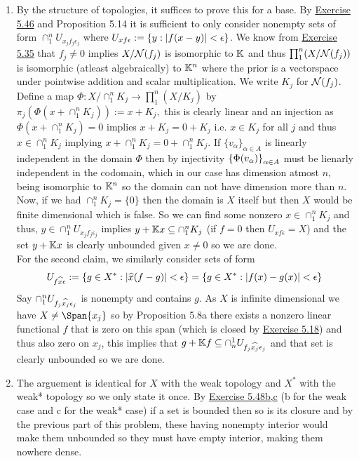 \documentclass[12pt,a4paper]{article}
\begin{document}
\begin{solution}
    \begin{enumerate}[label=\alph*.]
        \item By the structure of topologies, it suffices to prove this for a base. 
            By \hyperref[prob:5-46]{Exercise 5.46} and Proposition 5.14 it is sufficient to only consider nonempty sets of form $\cap_1^nU_{x_jf_j\epsilon_j}$ where $U_{xf\epsilon}:= \qty{y:|f(x-y)|<\epsilon}$. 
            We know from \hyperref[prob:5-35]{Exercise 5.35} that $f_j\neq 0$ implies $X/\mathcal{N}(f_j)$ is isomorphic to $\mathbb{K}$ and thus $\prod_1^n(X/\mathcal{N}(f_j))$ is isomorphic (atleast algebraically) to $\mathbb{K}^n$ where the prior is a vectorspace under pointwise addition and scalar multiplication. 
            We write $K_j$ for $\mathcal{N}(f_j)$. 
            Define a map $\Phi:X/\cap^n_1K_j\to\prod_1^n(X/K_j)$ by $\pi_j(\Phi(x+\cap_1^nK_j)):=x+K_j,$ this is clearly linear and an injection as $\Phi(x+\cap_1^nK_j)=0$ implies $x+K_j=0+K_j$ i.e. $x\in K_j$ for all $j$ and thus $x\in\cap_1^nK_j$ implying $x+\cap_1^nK_j=0+\cap_1^nK_j.$ 
            If $\{v_\alpha\}_{\alpha\in A}$ is linearly independent in the domain $\Phi$ then by injectivity $ \qty{\Phi(v_\alpha)}_{\alpha\in A}$ must be lienarly independent in the codomain, which in our case has dimension atmost $n,$ being isomorphic to $\mathbb{K}^n$ so the domain can not have dimension more than $n.$ 
            Now, if we had $\cap_1^nK_j=\{0\}$ then the domain is $X$ itself but then $X$ would be finite dimensional which is false. 
            So we can find some nonzero $x\in\cap_1^nK_j$ and thus, $y\in\cap_1^nU_{x_jf_j\epsilon_j}$ implies $y+\mathbb{K} x \subseteq\cap_1^nK_j$ (if $f=0$ then $U_{xf\epsilon}=X$) and the set $y+\mathbb{K} x$ is clearly unbounded given $x\neq 0$ so we are done. 
            \\
            For the second claim, we similarly consider sets of form 
            \[
                U_{f\widehat{x}\epsilon}:=\{g\in X^*:|\widehat{x}(f-g)|<\epsilon\}= \qty{g\in X^*:|f(x)-g(x)|<\epsilon}
            \]
            Say $\cap_1^nU_{f_j\widehat{x_j}\epsilon_j}$ is nonempty and contains $g$.
            As $X$ is infinite dimensional we have $X\neq\Span\{x_j\}$ so by Proposition 5.8a there exists a nonzero linear functional $f$ that is zero on this span (which is closed by \hyperref[prob:5-18]{Exercise 5.18}) and thus also zero on $x_j$, this implies that $g+\mathbb{K} f \subseteq\cap^1_nU_{f_j\widehat{x_j}\epsilon_j}$ and that set is clearly unbounded so we are done. 
        \item The arguement is identical for $X$ with the weak topology and $X^*$ with the weak* topology so we only state it once. By \hyperref[prob:5-48]{Exercise 5.48b,c} (b for the weak case and c for the weak* case) if a set is bounded then so is its closure and by the previous part of this problem, these having nonempty interior would make them unbounded so they must have empty interior, making them nowhere dense. 

\end{enumerate}
\end{solution}
\end{document}
